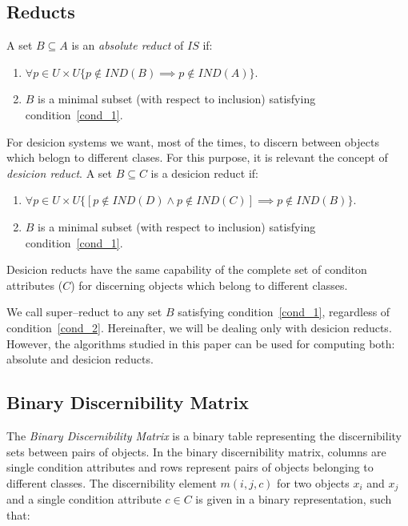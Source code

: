 \documentclass[authoryear,preprint,review,12pt]{elsarticle}
\begin{document}
\subsection{Reducts}\label{def_reduct}
  A set $B \subseteq A$ is an \textit{absolute reduct} of $IS$ if:
  \begin{enumerate}
  	\item $\forall p \in U\times U \lbrace p \notin IND(B) \implies p \notin IND(A)\rbrace$. \label{cond_1}
  	\item $B$ is a minimal subset (with respect to inclusion) satisfying condition~\ref{cond_1}.\label{cond_2}
  \end{enumerate}
 
  
  For desicion systems we want, most of the times, to discern between objects which belogn to different clases. For this purpose, it is relevant the concept of \textit{desicion reduct}. A set $B \subseteq C$ is a desicion reduct if:
  \begin{enumerate}
   	\item $\forall p \in U\times U \lbrace [p \notin IND(D) \wedge p \notin IND(C)] \implies p \notin IND(B)\rbrace$. \label{cond_1}
   	\item $B$ is a minimal subset (with respect to inclusion) satisfying condition~\ref{cond_1}.\label{cond_2}
  \end{enumerate}
  
  Desicion reducts have the same capability of the complete set of conditon attributes ($C$) for discerning objects which belong to different classes.
   
  We call super--reduct to any set $B$ satisfying condition~\ref{cond_1}, regardless of condition~\ref{cond_2}. Hereinafter, we will be dealing only with desicion reducts. However, the algorithms studied in this paper can be used for computing both: absolute and desicion reducts.
  
%  
\subsection{Binary Discernibility Matrix}
  The \textit{Binary Discernibility Matrix} is a binary table representing the discernibility sets between pairs 
  of objects. In the binary discernibility matrix, columns are single condition attributes and rows represent pairs of objects belonging to different classes. The discernibility element $m(i, j, c)$ for two objects $x_i$ and $x_j$ and a single condition attribute $c \in C$ is given in a binary representation, such that:
  
\end{document}
